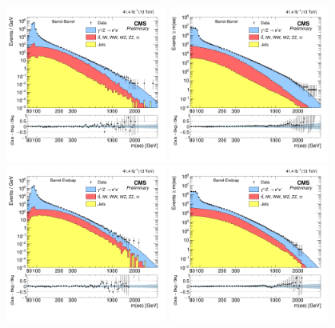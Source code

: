\begin{figure}[ht]
  \begin{center}
    \includegraphics[width=0.47\textwidth]{figures/Zprime/2017/mass/massHistEBEB}
    \includegraphics[width=0.47\textwidth]{figures/Zprime/2017/mass/cMassHistEBEB}
    \includegraphics[width=0.47\textwidth]{figures/Zprime/2017/mass/massHistEBEE}
    \includegraphics[width=0.47\textwidth]{figures/Zprime/2017/mass/cMassHistEBEE}

\end{center}
\end{figure}
